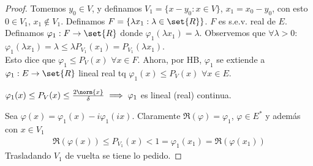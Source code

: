 \documentclass{notetaking}
\begin{document}
\begin{proof}
    Tomemos \(y_0\in V\), y definamos \(V_1=\{x-y_0:x\in V\}\), \(x_1=x_0-y_0\), con esto \(0\in V_1\), \(x_1\notin V_1\). Definamos \(F=\{\lambda x_1:\lambda\in\set{R}\}\). \(F\) es s.e.v. real de \(E\). Definamos \(\varphi_1:F\rightarrow\set{R}\) donde \(\varphi_1(\lambda x_1)=\lambda\). Observemos que \(\forall\lambda>0:\) \(\varphi_1(\lambda x_1)=\lambda\leq\lambda P_{V_1}(x_1)=P_{V_1}(\lambda x_1)\).\\
    Esto dice que \(\varphi_1\leq P_V(x)\) \(\forall x\in F\). Ahora, por HB, \(\varphi_1\) se extiende a \(\varphi_1:E\rightarrow\set{R}\) lineal real tq \(\varphi_1(x)\leq P_V(x)\) \(\forall x\in E\).
    \begin{obs}
        \(\varphi_1(x)\leq P_V(x)\leq \frac{2\norm{x}}\delta\implies\varphi_1\) es lineal (real) continua.
    \end{obs}
    Sea \(\varphi(x)=\varphi_1(x)-i\varphi_1(ix)\). Claramente \(\Re(\varphi)=\varphi_1\), \(\varphi\in E^*\) y además con \(x\in V_1\)
    \begin{align*}
        \Re(\varphi(x))\leq P_{V_1}(x)<1=\varphi_1(x_1)=\Re(\varphi(x_1))
    \end{align*}
    Trasladando \(V_1\) de vuelta se tiene lo pedido.
\end{proof}
\end{document}
